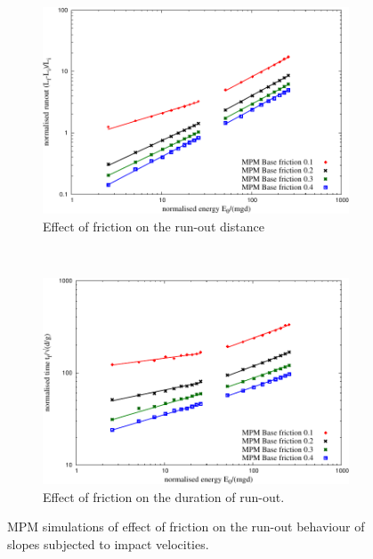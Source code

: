 \begin{figure}[tbhp]
\centering
\begin{subfigure}[b]{0.95\textwidth}
\centering
\includegraphics[width=\textwidth]{runout_fric_slope}
\caption{Effect of friction on the run-out distance}
\label{fig:runout_fric_slope}
\end{subfigure}
\\
\begin{subfigure}[b]{0.95\textwidth}
\centering
\includegraphics[width=\textwidth]{time_fric_slope}
\caption{Effect of friction on the duration of run-out.}
\label{fig:time_fric_slope}
\end{subfigure}
\caption{MPM simulations of effect of friction on the run-out behaviour of 
slopes subjected to impact velocities.}
\label{fig:fric_slope}
\end{figure}

